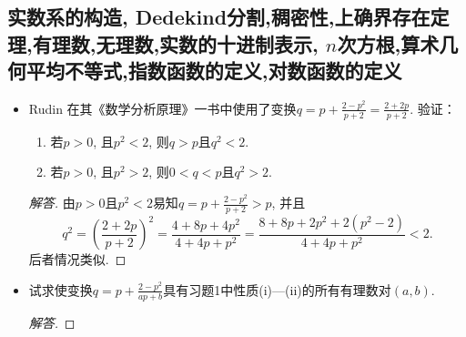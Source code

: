 \subsection{实数系的构造, Dedekind分割,稠密性,上确界存在定理,有理数,无理数,实数的十进制表示, \(n\)次方根,算术几何平均不等式,指数函数的定义,对数函数的定义}
\begin{4a}
\begin{itemize}
\item[1.]  Rudin 在其《数学分析原理》一书中使用了变换\(q=p+\frac{2-p^2}{p+2}=\frac{2+2p}{p+2}\). 验证：
\begin{enumerate}[label=(\roman*)]
    \item 若\(p>0\), 且\(p^2<2\), 则\(q>p\)且\(q^2<2\).
    \item 若\(p>0\), 且\(p^2>2\), 则\(0<q<p\)且\(q^2>2\).
\end{enumerate}
\begin{proof}[解答]
由\(p>0\)且\(p^2<2\)易知\(q=p+\frac{2-p^2}{p+2}>p\), 并且
\[q^2=\left(\frac{2+2p}{p+2}\right)^2=\frac{4+8p+4p^2}{4+4p+p^2}
=\frac{8+8p+2p^2+2(p^2-2)}{4+4p+p^2}<2.\]后者情况类似.
\end{proof}
\item[2.] 试求使变换\(q=p+\frac{2-p^2}{ap+b}\)具有习题1中性质(i)---(ii)的所有有理数对\((a,b)\).
\begin{proof}[解答]


\end{proof}
\end{itemize}
\end{4a}
